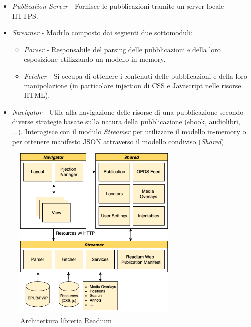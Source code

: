 \begin{itemize}
    \item \textit{Publication Server} - Fornisce le pubblicazioni tramite un server locale HTTPS.
    \item \textit{Streamer} - Modulo composto dai seguenti due sottomoduli:
    \begin{itemize}
        \item \textit{Parser} - Responsabile del parsing delle pubblicazioni e della loro esposizione utilizzando un modello in-memory.
        \item \textit{Fetcher} - Si occupa di ottenere i contenuti delle pubblicazioni e della loro manipolazione (in particolare injection di CSS e Javascript nelle risorse HTML).
    \end{itemize}
    \item \textit{Navigator} - Utile alla navigazione delle risorse di una pubblicazione secondo diverse strategie basate sulla natura della pubblicazione (ebook, audiolibri, ...). Interagisce con il modulo \textit{Streamer} per utilizzare il modello in-memory o per ottenere manifesto JSON attraverso il modello condiviso (\textit{Shared}).
\end{itemize}
\begin{figure}[H]
\centering
\includegraphics[width=0.7\textwidth]{img/tesi-22-readiumarch.drawio.png}
\caption{Architettura libreria Readium}
\end{figure}

